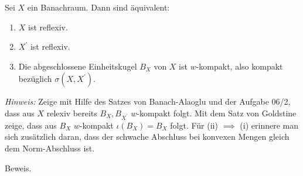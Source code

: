 \begin{exercise}
Sei $X$ ein Banachraum. Dann sind äquivalent:
\begin{enumerate}[label = \roman*)]
  \item  $X$ ist reflexiv.
  \item $X^{\prime}$ ist reflexiv.
  \item Die abgeschlossene Einheitskugel $B_X$ von $X$ ist $w$-kompakt, also
  kompakt bezüglich $\sigma(X,X^{\prime})$.
\end{enumerate}
\textit{Hinweis:} Zeige mit Hilfe des Satzes von Banach-Alaoglu und der Aufgabe 06/2,
dass aus $X$ relexiv bereits $B_X, B_{X^{\prime}}$ $w$-kompakt folgt. Mit dem Satz
von Goldstine zeige, dass aus $B_X$ $w$-kompakt $\iota(B_X) = B_X$ folgt.
Für (ii) $\implies$ (i) erinnere man sich zusätzlich daran, dass der schwache
Abschluss bei konvexen Mengen gleich dem Norm-Abschluss ist.
\end{exercise}
\begin{solution}
Beweis.
\end{solution}
